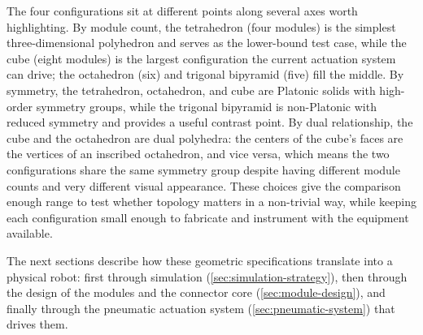 The four configurations sit at different points along several axes worth highlighting. By module count, the tetrahedron (four modules) is the simplest three-dimensional polyhedron and serves as the lower-bound test case, while the cube (eight modules) is the largest configuration the current actuation system can drive; the octahedron (six) and trigonal bipyramid (five) fill the middle. By symmetry, the tetrahedron, octahedron, and cube are Platonic solids with high-order symmetry groups, while the trigonal bipyramid is non-Platonic with reduced symmetry and provides a useful contrast point. By dual relationship, the cube and the octahedron are dual polyhedra: the centers of the cube's faces are the vertices of an inscribed octahedron, and vice versa, which means the two configurations share the same symmetry group despite having different module counts and very different visual appearance. These choices give the comparison enough range to test whether topology matters in a non-trivial way, while keeping each configuration small enough to fabricate and instrument with the equipment available.

The next sections describe how these geometric specifications translate into a physical robot: first through simulation (\cref{sec:simulation-strategy}), then through the design of the modules and the connector core (\cref{sec:module-design}), and finally through the pneumatic actuation system (\cref{sec:pneumatic-system}) that drives them.
